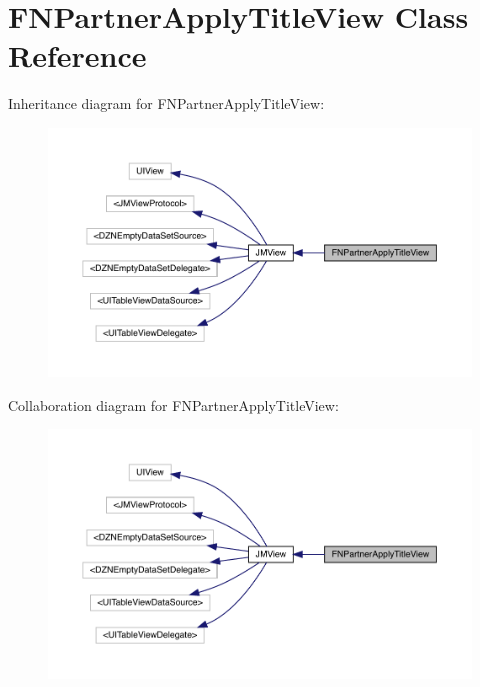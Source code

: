 \hypertarget{interface_f_n_partner_apply_title_view}{}\section{F\+N\+Partner\+Apply\+Title\+View Class Reference}
\label{interface_f_n_partner_apply_title_view}


Inheritance diagram for F\+N\+Partner\+Apply\+Title\+View\+:\nopagebreak
\begin{figure}[H]
\begin{center}
\leavevmode
\includegraphics[width=350pt]{interface_f_n_partner_apply_title_view__inherit__graph}
\end{center}
\end{figure}


Collaboration diagram for F\+N\+Partner\+Apply\+Title\+View\+:\nopagebreak
\begin{figure}[H]
\begin{center}
\leavevmode
\includegraphics[width=350pt]{interface_f_n_partner_apply_title_view__coll__graph}
\end{center}
\end{figure}
